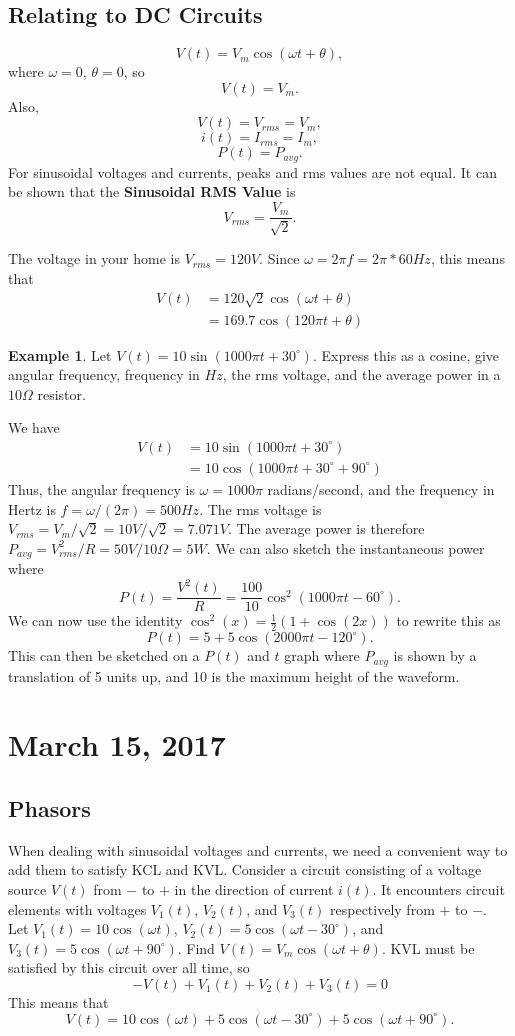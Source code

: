 \documentclass[11pt]{article}
\theoremstyle{plain} %
\theoremstyle{definition}
\theoremstyle{example}
\newtheorem*{example}{Example}
\theoremstyle{remark}
\begin{document}
\subsection{Relating to DC Circuits}
$$V(t) = V_m\cos(\omega t+\theta),$$
where $\omega = 0$, $\theta = 0$, so 
$$V(t) = V_m.$$
Also,
$$V(t) = V_{rms} = V_m,$$
$$i(t) = I_{rms} = I_m,$$
$$P(t) = P_{avg}.$$
For sinusoidal voltages and currents, peaks and rms values are not equal. It can be shown that the \textbf{Sinusoidal RMS Value} is 
$$V_{rms} = \frac{V_m}{\sqrt 2}.$$

The voltage in your home is $V_{rms} = 120V$. Since $\omega = 2\pi f = 2 \pi *60Hz$, this means that
\begin{align*}
	V(t) &= 120\sqrt 2 \cos(\omega t + \theta)\\
	&= 169.7\cos(120\pi t + \theta)
\end{align*}

\begin{example}
Let $V(t) = 10\sin(1000\pi t + 30^{\circ})$. Express this as a cosine, give angular frequency, frequency in $Hz$, the rms voltage, and the average power in a $10\Omega$ resistor. 
\end{example}
We have 
\begin{align*}
	V(t) &= 10\sin(1000\pi t + 30^{\circ})\\
	&= 10\cos(1000\pi t + 30^{\circ} + 90^{\circ})
\end{align*}
Thus, the angular frequency is $\omega = 1000\pi $ radians/second, and the frequency in Hertz is $f = \omega/(2\pi) = 500Hz$. The rms voltage is $V_{rms} = V_m/\sqrt 2 = 10V/\sqrt 2 = 7.071V$. The average power is therefore $P_{avg} = V^2_{rms}/R = 50V/10\Omega = 5W$. We can also sketch the instantaneous power where 
$$P(t) = \frac{V^2(t)}{R} = \frac{100}{10}\cos^2(1000\pi t - 60^{\circ}).$$
We can now use the identity $\cos^2(x) = \frac{1}{2}(1+\cos(2x))$ to rewrite this as 
$$P(t) = 5+5\cos(2000\pi t - 120^{\circ}).$$ This can then be sketched on a $P(t)$ and $t$ graph where $P_{avg}$ is shown by a translation of 5 units up, and 10 is the maximum height of the waveform. 

\section{March 15, 2017}
\subsection{Phasors}
When dealing with sinusoidal voltages and currents, we need a convenient way to add them to satisfy KCL and KVL. Consider a circuit consisting of a voltage source $V(t)$ from $-$ to $+$ in the direction of current $i(t)$. It encounters circuit elements with voltages $V_1(t)$, $V_2(t)$, and $V_3(t)$ respectively from $+$ to $-$. Let $V_1(t) = 10\cos(\omega t)$, $V_2(t) = 5\cos(\omega t - 30^{\circ})$, and $V_3(t) = 5\cos(\omega t + 90 ^{\circ})$. Find $V(t) = V_m\cos(\omega t + \theta)$. KVL must be satisfied by this circuit over all time, so 
$$-V(t) + V_1(t) + V_2(t) + V_3(t) = 0$$
This means that 
$$V(t) = 10\cos(\omega t ) + 5\cos(\omega t - 30^{\circ}) + 5\cos(\omega t + 90^{\circ}).$$
\end{document}
